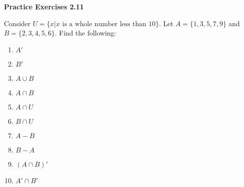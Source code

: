 \vspace{0.3ex}
\noindent\textbf{Practice Exercises 2.11}

\vspace{0.2ex}

Consider \(U = \{x|x \text{ is a whole number less than } 10\}\). Let \(A = \{1,3,5,7,9\}\) and \(B = \{2,3,4,5,6\}\). Find the following:
\begin{multicols}{2}
\begin{enumerate}[noitemsep, label = \color{blue}\arabic*. ]
\item \(A'\)
\item \(B'\)
\item \(A \cup B\)
\item \(A \cap B\)
\item \(A \cap U\)
\item \(B \cap U\)
\item \(A - B\)
\item \(B - A\)
\item \((A \cap B)'\)
\item \(A' \cap B'\)
\end{enumerate}
\end{multicols}
